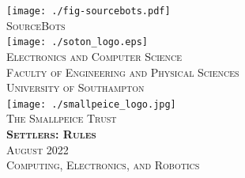 \documentclass[twoside,12pt,a4paper,titlepage]{article}
\title{\gamename}
\author{\org}
\date{\timeline}
\newcommand{\gamename}{Settlers\xspace}
\newcommand{\timeline}{August 2022\xspace}
\begin{document}
\begin{titlepage}
\begin{center}
\texttt{[image: ./fig-sourcebots.pdf]}~\\[1cm]
\textsc{\large SourceBots}~\\[1.8cm]
\texttt{[image: ./soton\_logo.eps]}~\\[1cm]
\textsc{\large Electronics and Computer Science}\\[0.2cm]
\textsc{\large Faculty of Engineering and Physical Sciences}\\[0.2cm]
\textsc{\large University of Southampton}\\[1.8cm]
\texttt{[image: ./smallpeice\_logo.jpg]}~\\[0.2cm]
\textsc{\large The Smallpeice Trust}\\[1.8cm]
\textsc{\huge \textbf{\gamename{}: Rules}}\\[1cm]
\textsc{\large \timeline}\\[1.2cm]
\textsc{\Large Computing, Electronics, and Robotics}
\end{center}
\end{titlepage}


\clearpage

\clearpage

\end{document}
